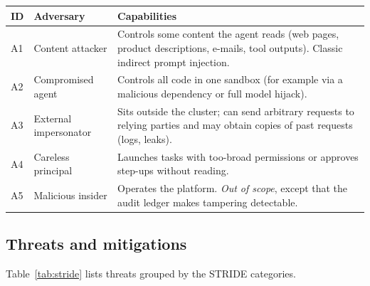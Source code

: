 \begin{center}
\small
\begin{tabularx}{\linewidth}{@{}lL{3.6cm}Y@{}}
\toprule
\textbf{ID} & \textbf{Adversary} & \textbf{Capabilities}\\
\midrule
A1 & Content attacker & Controls some content the agent reads (web pages, product descriptions, e-mails, tool outputs). Classic indirect prompt injection.\\
A2 & Compromised agent & Controls all code in one sandbox (for example via a malicious dependency or full model hijack).\\
A3 & External impersonator & Sits outside the cluster; can send arbitrary requests to relying parties and may obtain copies of past requests (logs, leaks).\\
A4 & Careless principal & Launches tasks with too-broad permissions or approves step-ups without reading.\\
A5 & Malicious insider & Operates the platform. \emph{Out of scope}, except that the audit ledger makes tampering detectable.\\
\bottomrule
\end{tabularx}
\end{center}

\subsection{Threats and mitigations}

Table~\ref{tab:stride} lists threats grouped by the STRIDE categories.

